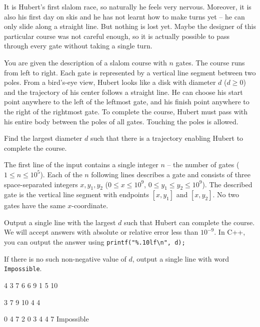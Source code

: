 

It is Hubert's first slalom race, so naturally he feels very nervous. Moreover,
it is also his first day on skis and he has not learnt how to make turns yet --
he can only slide along a straight line. But nothing is lost yet. Maybe the
designer of this particular course was not careful enough, so it is actually
possible to pass through every gate without taking a single turn.



You are given the description of a slalom course with $n$ gates. The course runs
from left to right. Each gate is represented by a vertical line segment between
two poles. From a bird's-eye view, Hubert looks like a disk with diameter $d$
($d \geq 0$) and the trajectory of his center follows a straight line. He can
choose his start point anywhere to the left of the leftmost gate, and his finish
point anywhere to the right of the rightmost gate. To complete the course,
Hubert must pass with his entire body between the poles of all gates. Touching
the poles is allowed.

Find the largest diameter $d$ such that there is a trajectory enabling Hubert to
complete the course.



The first line of the input contains a single integer $n$ -- the number of gates
($1 \leq n \leq 10^5$). Each of the $n$ following lines describes a gate and
consists of three space-separated integers $x, y_1, y_2$ ($0 \leq x \leq 10^9$,
$0 \leq y_1 \leq y_2 \leq 10^9$). The described gate is the vertical line
segment with endpoints $[x, y_1]$ and $[x, y_2]$. No two gates have the same
$x$-coordinate.



Output a single line with the largest $d$ such that Hubert can complete the
course. We will accept answers with absolute or relative error less than
$10^{-9}$. In C++, you can output the answer using
\verb!printf("%.10lf\n", d);!

If there is no such non-negative value of $d$, output a single line with word
\texttt{Impossible}.



4 3 7
6 6 9
1 5 10
\sampleEND

3 7 9
10 4 4
\sampleEND

0 4 7
2 0 3
4 4 7
\sampleOUT
Impossible
\sampleEND


